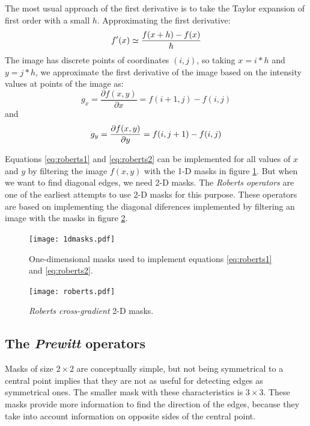 \documentclass{ipol}
\numberwithin{equation}{section}
\numberwithin{table}{section}
\numberwithin{figure}{section}
\begin{document}
The most usual approach of the first derivative is to take the Taylor expansion of first order with
a small $h$. Approximating the first derivative:
\begin{equation}
	f'(x) \simeq \frac{f(x+h) - f(x)}{h}\\
\end{equation}
The image has discrete points of coordinates $(i,j)$, so taking $x=i*h$ and $y=j*h$, we approximate the 
first derivative of the image based on the intensity values ​​at points of the image as:
\begin{equation}
\label{eq:roberts1}
	g_x = \frac{\partial f(x,y)}{\partial x} = f(i+1,j) - f(i,j)
\end{equation}
and
\begin{equation}
\label{eq:roberts2}
	g_y = \frac{\partial f(x,y)}{\partial y} = f(i,j+1) - f(i,j)\\
\end{equation}

Equations \ref{eq:roberts1} and \ref{eq:roberts2} can be implemented for all values of $x$ and $y$
by filtering the image $f(x,y)$ with the 1-D masks in figure \ref{fig:1dmasks}. But when we want 
to find diagonal edges, we need 2-D masks. The \textit{Roberts operators} are one of the earliest 
attempts to use 2-D masks for this purpose. These operators are based on implementing the diagonal 
diferences implemented by filtering an image with the masks in figure \ref{fig:roberts}.\\

\begin{figure}
	\centering
	\texttt{[image: 1dmasks.pdf]}
	\caption{One-dimensional masks used to implement equations \ref{eq:roberts1} and \ref{eq:roberts2}.}
	\label{fig:1dmasks}
\end{figure}

\begin{figure}
	\centering
	\texttt{[image: roberts.pdf]}
	\caption{\textit{Roberts cross-gradient} 2-D masks.}
	\label{fig:roberts}
\end{figure}

\subsection{The \textit{Prewitt} operators}

Masks of size $2\times2$ are conceptually simple, but not being symmetrical to a central point implies 
that they are not as useful for detecting edges as symmetrical ones. The smaller mask with these characteristics is 
$3\times3$. These masks provide more information to find the direction of the edges, because they take 
into account information on opposite sides of the central point.\\
\end{document}
